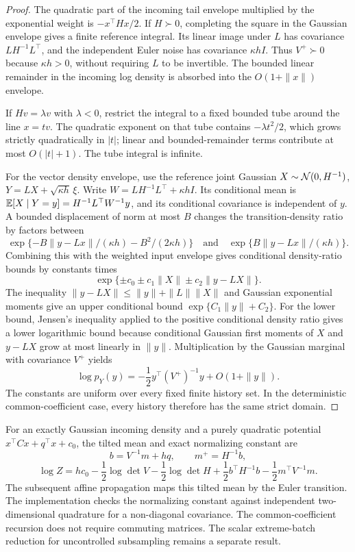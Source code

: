 \begin{proof}
The quadratic part of the incoming tail envelope multiplied by the exponential weight is $-x^\top Hx/2$. If $H\succ0$, completing the square in the Gaussian envelope gives a finite reference integral. Its linear image under $L$ has covariance $LH^{-1}L^\top$, and the independent Euler noise has covariance $\kappa hI$. Thus $V^+\succ0$ because $\kappa h>0$, without requiring $L$ to be invertible. The bounded linear remainder in the incoming log density is absorbed into the $O(1+\|x\|)$ envelope.

If $Hv=\lambda v$ with $\lambda<0$, restrict the integral to a fixed bounded tube around the line $x=tv$. The quadratic exponent on that tube contains $-\lambda t^2/2$, which grows strictly quadratically in $|t|$; linear and bounded-remainder terms contribute at most $O(|t|+1)$. The tube integral is infinite.

For the vector density envelope, use the reference joint Gaussian $X\sim\mathcal N(0,H^{-1})$, $Y=LX+\sqrt{\kappa h}\,\xi$. Write $W=LH^{-1}L^\top+\kappa hI$. Its conditional mean is $\mathbb E[X\mid Y=y]=H^{-1}L^\top W^{-1}y$, and its conditional covariance is independent of $y$. A bounded displacement of norm at most $B$ changes the transition-density ratio by factors between
\[
\exp\{-B\|y-Lx\|/(\kappa h)-B^2/(2\kappa h)\}
\quad\text{and}\quad
\exp\{B\|y-Lx\|/(\kappa h)\}.
\]
Combining this with the weighted input envelope gives conditional density-ratio bounds by constants times
\[
\exp\{\pm c_0\pm c_1\|X\|\pm c_2\|y-LX\|\}.
\]
The inequality $\|y-LX\|\leq\|y\|+\|L\|\|X\|$ and Gaussian exponential moments give an upper conditional bound $\exp\{C_1\|y\|+C_2\}$. For the lower bound, Jensen's inequality applied to the positive conditional density ratio gives a lower logarithmic bound because conditional Gaussian first moments of $X$ and $y-LX$ grow at most linearly in $\|y\|$. Multiplication by the Gaussian marginal with covariance $V^+$ yields
\[
\log p_Y(y)=-\frac12y^\top(V^+)^{-1}y+O(1+\|y\|).
\]
The constants are uniform over every fixed finite history set. In the deterministic common-coefficient case, every history therefore has the same strict domain.
\end{proof}

For an exactly Gaussian incoming density and a purely quadratic potential $x^\top Cx+q^\top x+c_0$, the tilted mean and exact normalizing constant are
\[
b=V^{-1}m+hq,\qquad m^+=H^{-1}b,
\]
\[
\log Z=hc_0-\frac12\log\det V-\frac12\log\det H+\frac12b^\top H^{-1}b-\frac12m^\top V^{-1}m.
\]
The subsequent affine propagation maps this tilted mean by the Euler transition. The implementation checks the normalizing constant against independent two-dimensional quadrature for a non-diagonal covariance. The common-coefficient recursion does not require commuting matrices. The scalar extreme-batch reduction for uncontrolled subsampling remains a separate result.
